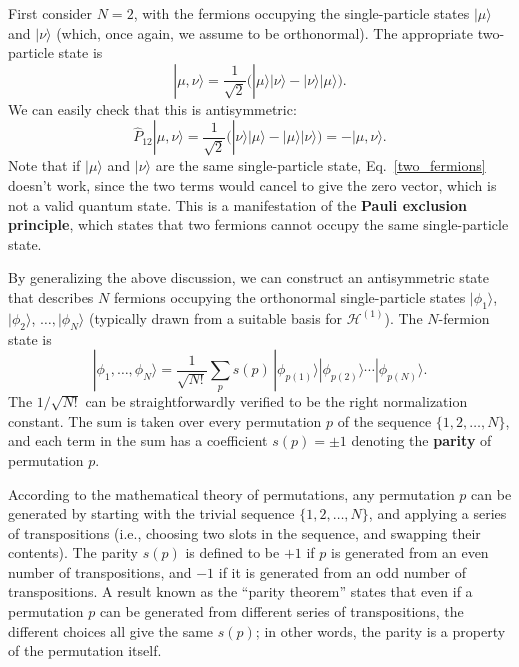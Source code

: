 \documentclass[pra,12pt]{revtex4-2}
\begin{document}
First consider $N=2$, with the fermions occupying the single-particle
states $|\mu\rangle$ and $|\nu\rangle$ (which, once again, we assume
to be orthonormal).  The appropriate two-particle state is
\begin{equation}
  |\mu,\nu\rangle = \frac{1}{\sqrt{2}}
  \Big(|\mu\rangle|\nu\rangle - |\nu\rangle|\mu\rangle\Big).
  \label{two_fermions}
\end{equation}
We can easily check that this is antisymmetric:
\begin{equation}
  \hat{P}_{12} |\mu,\nu\rangle = \frac{1}{\sqrt{2}}
  \Big(|\nu\rangle|\mu\rangle - |\mu\rangle|\nu\rangle\Big)
  = - |\mu,\nu\rangle.
\end{equation}
Note that if $|\mu\rangle$ and $|\nu\rangle$ are the same
single-particle state, Eq.~\eqref{two_fermions} doesn't work, since
the two terms would cancel to give the zero vector, which is not a
valid quantum state.  This is a manifestation of the \textbf{Pauli
  exclusion principle}, which states that two fermions cannot occupy
the same single-particle state.

By generalizing the above discussion, we can construct an
antisymmetric state that describes $N$ fermions occupying the
orthonormal single-particle states $|\phi_1\rangle$, $|\phi_2\rangle$,
$\dots, |\phi_N\rangle$ (typically drawn from a suitable basis for
$\mathscr{H}^{(1)}$).  The $N$-fermion state is
\begin{equation}
  |\phi_1,\dots,\phi_N\rangle = \frac{1}{\sqrt{N!}} \sum_p s(p)\, |\phi_{p(1)}\rangle |\phi_{p(2)}\rangle \cdots |\phi_{p(N)}\rangle.
  \label{Nfermions}
\end{equation}
The $1/\sqrt{N!}$ can be straightforwardly verified to be the right
normalization constant.  The sum is taken over every permutation $p$
of the sequence $\{1,2,\dots,N\}$, and each term in the sum has a
coefficient $s(p) = \pm1$ denoting the \textbf{parity} of permutation
$p$.

According to the mathematical theory of permutations, any permutation
$p$ can be generated by starting with the trivial sequence $\{1, 2,
\dots, N\}$, and applying a series of transpositions (i.e., choosing
two slots in the sequence, and swapping their contents).  The parity
$s(p)$ is defined to be $+1$ if $p$ is generated from an even number
of transpositions, and $-1$ if it is generated from an odd number of
transpositions.  A result known as the ``parity theorem'' states that
even if a permutation $p$ can be generated from different series of
transpositions, the different choices all give the same $s(p)$; in
other words, the parity is a property of the permutation itself.
\end{document}
